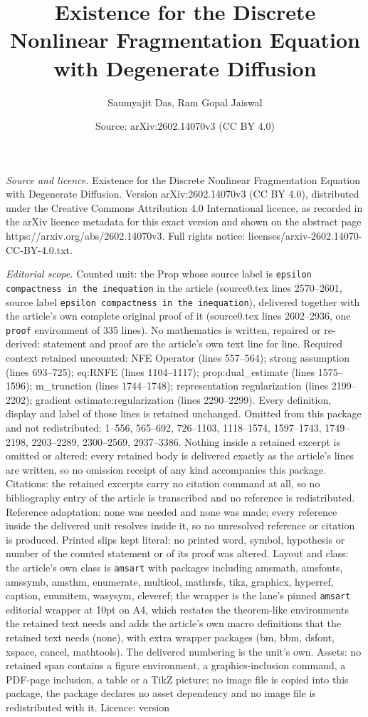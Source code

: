 \documentclass[10pt,a4paper]{amsart}
\title[Existence for the Discrete Nonlinear Fragmentation Equation ]{Existence for the Discrete Nonlinear Fragmentation Equation with Degenerate Diffusion}
\author{Saumyajit Das, Ram Gopal Jaiswal}
\date{Source: arXiv:2602.14070v3 (CC BY 4.0)}
\begin{document}
\maketitle

\noindent\emph{Source and licence.} Existence for the Discrete Nonlinear Fragmentation Equation with Degenerate Diffusion. Version arXiv:2602.14070v3 (CC BY 4.0), distributed under the Creative Commons Attribution 4.0 International licence, as recorded in the arXiv licence metadata for this exact version and shown on the abstract page https://arxiv.org/abs/2602.14070v3. Full rights notice: licenses/arxiv-2602.14070-CC-BY-4.0.txt.\par\smallskip

\noindent\textit{Editorial scope.} Counted unit: the Prop whose source label is \texttt{epsilon compactness in the inequation} in the article (source0.tex lines 2570--2601, source label \texttt{epsilon compactness in the inequation}), delivered together with the article's own complete original proof of it (source0.tex lines 2602--2936, one \texttt{proof} environment of 335 lines). No mathematics is written, repaired or re-derived: statement and proof are the article's own text line for line. Required context retained uncounted: NFE Operator (lines 557--564); strong assumption (lines 693--725); eq:RNFE (lines 1104--1117); prop:dual\_estimate (lines 1575--1596); m\_trunction (lines 1744--1748); representation regularization (lines 2199--2202); gradient estimate:regularization (lines 2290--2299). Every definition, display and label of those lines is retained unchanged. Omitted from this package and not redistributed: 1--556, 565--692, 726--1103, 1118--1574, 1597--1743, 1749--2198, 2203--2289, 2300--2569, 2937--3386. Nothing inside a retained excerpt is omitted or altered: every retained body is delivered exactly as the article's lines are written, so no omission receipt of any kind accompanies this package. Citations: the retained excerpts carry no citation command at all, so no bibliography entry of the article is transcribed and no reference is redistributed. Reference adaptation: none was needed and none was made; every reference inside the delivered unit resolves inside it, so no unresolved reference or citation is produced. Printed slips kept literal: no printed word, symbol, hypothesis or number of the counted statement or of its proof was altered. Layout and class: the article's own class is \texttt{amsart} with packages including amsmath, amsfonts, amssymb, amsthm, enumerate, multicol, mathrsfs, tikz, graphicx, hyperref, caption, enumitem, wasysym, cleveref; the wrapper is the lane's pinned \texttt{amsart} editorial wrapper at 10pt on A4, which restates the theorem-like environments the retained text needs and adds the article's own macro definitions that the retained text needs (none), with extra wrapper packages (bm, bbm, dsfont, xspace, cancel, mathtools). The delivered numbering is the unit's own. Assets: no retained span contains a figure environment, a graphics-inclusion command, a PDF-page inclusion, a table or a TikZ picture; no image file is copied into this package, the package declares no asset dependency and no image file is redistributed with it. Licence: version 
\end{document}
